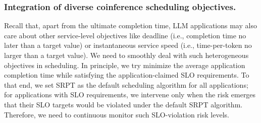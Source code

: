     

    
    



\subsubsection{Integration of diverse coinference scheduling objectives.}
Recall that, apart from the ultimate completion time, LLM applications may also care about other service-level objectives like deadline (i.e., completion time no later than a target value) or instantaneous service speed (i.e., time-per-token no larger than a target value).
We need to smoothly deal with such heterogeneous objectives in scheduling.
In principle, we try minimize the average application completion time while satisfying the application-claimed SLO requirements.
To that end, we set SRPT as the default scheduling algorithm for all applications; for applications with SLO requirements, we intervene only when the risk emerges that their SLO targets would be violated under the default SRPT algorithm.			
Therefore, we need to continuous monitor such SLO-violation risk levels. 

